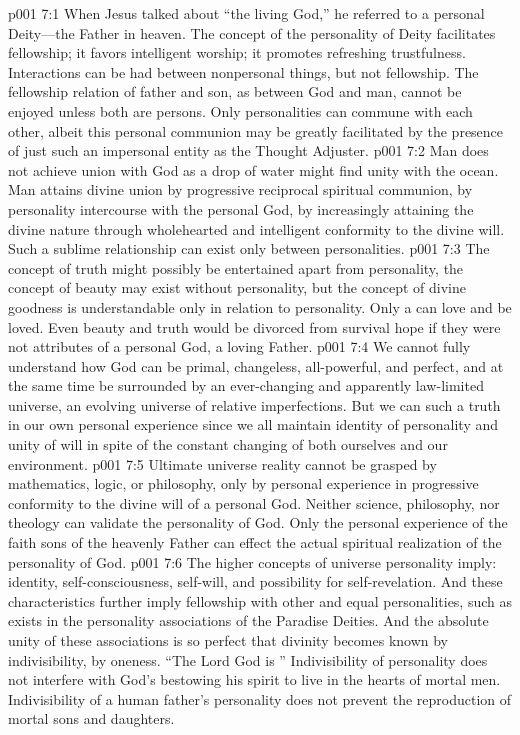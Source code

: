 \vs p001 7:1 When Jesus talked about \textcolor{ubdarkred}{“the living God,”} he referred to a personal Deity---the Father in heaven. The concept of the personality of Deity facilitates fellowship; it favors intelligent worship; it promotes refreshing trustfulness. Interactions can be had between nonpersonal things, but not fellowship. The fellowship relation of father and son, as between God and man, cannot be enjoyed unless both are persons. Only personalities can commune with each other, albeit this personal communion may be greatly facilitated by the presence of just such an impersonal entity as the Thought Adjuster.
\vs p001 7:2 Man does not achieve union with God as a drop of water might find unity with the ocean. Man attains divine union by progressive reciprocal spiritual communion, by personality intercourse with the personal God, by increasingly attaining the divine nature through wholehearted and intelligent conformity to the divine will. Such a sublime relationship can exist only between personalities.
\pc \vs p001 7:3 The concept of truth might possibly be entertained apart from personality, the concept of beauty may exist without personality, but the concept of divine goodness is understandable only in relation to personality. Only a  can love and be loved. Even beauty and truth would be divorced from survival hope if they were not attributes of a personal God, a loving Father.
\pc \vs p001 7:4 We cannot fully understand how God can be primal, changeless, all\hyp{}powerful, and perfect, and at the same time be surrounded by an ever\hyp{}changing and apparently law\hyp{}limited universe, an evolving universe of relative imperfections. But we can  such a truth in our own personal experience since we all maintain identity of personality and unity of will in spite of the constant changing of both ourselves and our environment.
\vs p001 7:5 Ultimate universe reality cannot be grasped by mathematics, logic, or philosophy, only by personal experience in progressive conformity to the divine will of a personal God. Neither science, philosophy, nor theology can validate the personality of God. Only the personal experience of the faith sons of the heavenly Father can effect the actual spiritual realization of the personality of God.
\pc \vs p001 7:6 The higher concepts of universe personality imply: identity, self\hyp{}consciousness, self\hyp{}will, and possibility for self\hyp{}revelation. And these characteristics further imply fellowship with other and equal personalities, such as exists in the personality associations of the Paradise Deities. And the absolute unity of these associations is so perfect that divinity becomes known by indivisibility, by oneness. “The Lord God is ” Indivisibility of personality does not interfere with God’s bestowing his spirit to live in the hearts of mortal men. Indivisibility of a human father’s personality does not prevent the reproduction of mortal sons and daughters.\plusone
